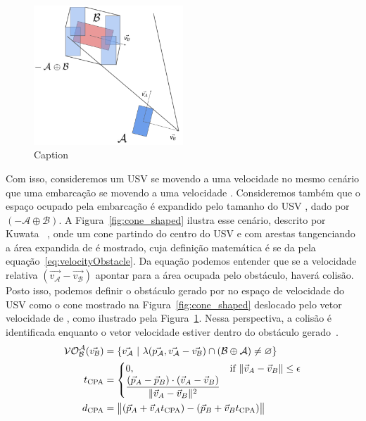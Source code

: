         \begin{figure}
            \centering
            \includegraphics[width=0.5\textwidth]{fig/chap2/vo.png}
            \caption{Caption}
            \label{fig:vo}
        \end{figure}
        
        Com isso, consideremos um USV \A se movendo a uma velocidade \va no mesmo cenário que uma embarcação \B se movendo a uma velocidade \vb. Consideremos também que o espaço ocupado pela embarcação \B é expandido pelo tamanho do USV \A, dado por $(-\mathcal{A} \oplus \mathcal{B})$. A Figura~\ref{fig:cone_shaped} ilustra esse cenário, descrito por Kuwata \etal~\cite{KUWATA2014110}, onde um cone partindo do centro do USV \A e com arestas tangenciando a área expandida de \B é mostrado, cuja definição matemática é se da pela equação~\eqref{eq:velocityObstacle}. Da equação podemos entender que se a velocidade relativa $(\vec{v_\mathcal{A}} - \vec{v_\mathcal{B}})$ apontar para a área ocupada pelo obstáculo, haverá colisão. Posto isso, podemos definir o obstáculo gerado por \B no espaço de velocidade do USV \A como o cone mostrado na Figura~\ref{fig:cone_shaped} deslocado pelo vetor velocidade de \vb, como ilustrado pela Figura~\ref{fig:vo}. Nessa perspectiva, a colisão é identificada enquanto o vetor velocidade \va estiver dentro do obstáculo gerado~\cite{KUWATA2014110}.
        \begin{align}
            \mathcal{VO^A_B}(\vec{v_\mathcal{B}}) &= \{\vec{v_\mathcal{A}}~|~\lambda(\vec{p_\mathcal{A}}, \vec{v_\mathcal{A}} - \vec{v_\mathcal{B}}) \cap (\mathcal{B} \oplus \mathcal{A}) \neq \varnothing\}\label{eq:velocityObstacle}\\
            t_{\rm CPA} &=
            \begin{cases}
                0, & \text{if } \Vert\vec{v}_{A}-\vec{v}_{B}\Vert\leq\epsilon\\
                \displaystyle{{(\vec{p}_{A}-\vec{p}_{B})\cdot(\vec{v}_{A}-\vec{v}_{B})}\over{\Vert\vec{v}_{A}-\vec{v}_{B}\Vert^{2}}}
            \end{cases}\label{eq:tcpa}\\
            d_{\rm CPA} &=\bigl\Vert (\vec{p}_{A}+\vec{v}_{A}t_{\rm CPA})-(\vec{p}_{B}+\vec{v}_{B}t_{\rm CPA})\bigr\Vert\label{eq:dcpa}
        \end{align}
        
